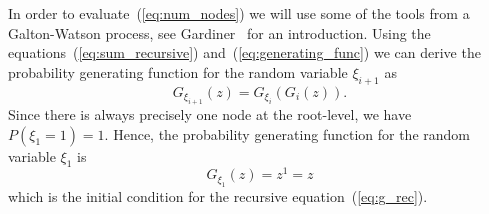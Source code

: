 \documentclass[10pt,letterpaper]{article}
\begin{document}
%

In order to evaluate~(\cref{eq:num_nodes}) we will use some of the tools from 
a Galton-Watson process, see Gardiner~\cite{gardiner1985stochastic} for 
an introduction.
Using the equations~(\cref{eq:sum_recursive}) and~(\cref{eq:generating_func}) we can 
derive the probability generating function for the random variable $\xi_{i+1}$ as 
\begin{equation}\label{eq:g_rec}
G_{\xi_{i+1}}(z) = G_{\xi_i}(G_i(z)).
\end{equation}
Since there is always precisely one node at the root-level, we have $P(\xi_1 = 1) = 1.$ 
Hence, the probability generating function for the random variable $\xi_1$ is 
\begin{equation}\label{eq:g_xi_one}
G_{\xi_1}(z) = z^1 = z
\end{equation}
which is the initial condition for the recursive equation~(\cref{eq:g_rec}).
\end{document}
